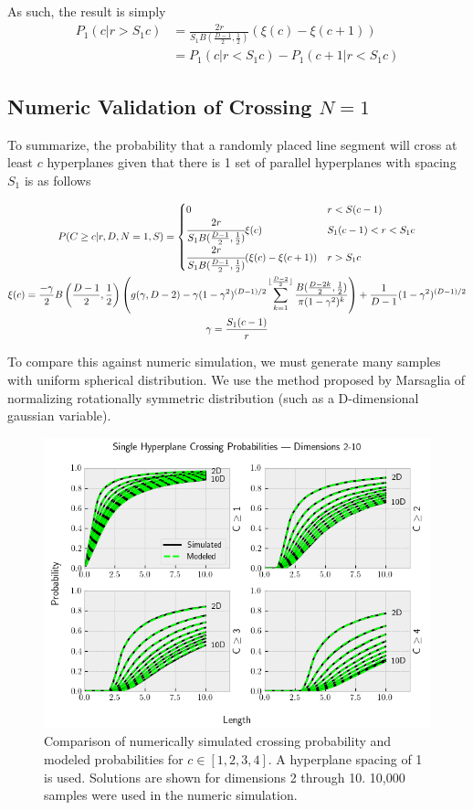 \documentclass{article}
\begin{document}
As such, the result is simply
\begin{align}
	P_1(c | r>S_1c) &= \frac{2r}{S_1 B(\frac{D-1}{2}, \frac{1}{2})} (\xi(c) - \xi(c+1)) \\
	&= P_1(c | r<S_1c) - P_1(c+1 | r<S_1c)
\end{align}


\subsection{Numeric Validation of Crossing $N=1$}
To summarize, the probability that a randomly placed line segment will cross at least $c$
hyperplanes given that there is 1 set of parallel hyperplanes with spacing $S_1$ is as follows

\begin{gather}
	P(C\ge c | r, D, N=1, S) = \begin{cases}
		0 & r < S(c-1) \\ 
		\cfrac{2r}{S_1 B(\frac{D-1}{2}, \frac{1}{2})} \xi(c)  & S_1 (c-1) < r < S_1 c \\
		\cfrac{2r}{S_1 B(\frac{D-1}{2}, \frac{1}{2})} (\xi(c)-\xi(c+1)) & r > S_1c		
	\end{cases} \\
	\xi(c) = \frac{-\gamma}{2}B\left(\frac{D-1}{2}, \frac{1}{2}\right)\left(g(\gamma, D-2)-\gamma(1-\gamma^2)^{(D-1)/2}\sum_{k=1}^{\lfloor \frac{D-2}{2} \rfloor}\frac{B(\frac{D-2k}{2}, \frac{1}{2})}{\pi(1-\gamma^2)^k}\right) + \frac{1}{D-1}(1-\gamma^2)^{(D-1)/2} \\
	\gamma = \frac{S_1(c-1)}{r} 
\end{gather}

To compare this against numeric simulation, we must generate many samples with uniform spherical
distribution. We use the method proposed by Marsaglia of normalizing rotationally symmetric
distribution (such as a D-dimensional gaussian variable).

\begin{figure}[h]
	\centerline{\includegraphics[width=5in]{numeric_sim_N1.png}}
	\caption{Comparison of numerically simulated crossing probability and modeled probabilities
	for $c\in[1, 2, 3, 4]$. A hyperplane spacing of 1 is used. Solutions are shown for dimensions 2 through 10. 10,000 samples were
	used in the numeric simulation.}
	\label{fig:numeric sim N1}
\end{figure}
\end{document}
